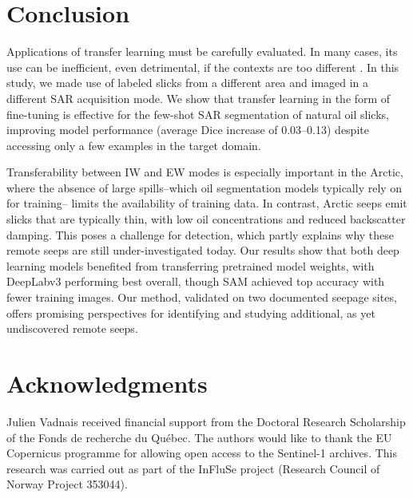 \documentclass[lettersize,journal]{IEEEtran}
\begin{document}
\section{Conclusion}
Applications of transfer learning must be carefully evaluated. In many cases, its use can be inefficient, even detrimental, if the contexts are too different \cite{mensinkFactorsInfluenceTransfer2022}.
In this study, we made use of labeled slicks from a different area and imaged in a different SAR acquisition mode. We show that transfer learning in the form of fine-tuning is effective for the few-shot SAR segmentation
of natural oil slicks, improving model performance (average Dice increase of 0.03--0.13) despite accessing only a few examples in the target domain.

Transferability between IW and EW modes is especially important in the Arctic, where the absence of large spills--which oil segmentation models typically rely on for training-- 
limits the availability of training data. In contrast, Arctic seeps emit slicks that are typically thin, with low oil concentrations and reduced backscatter damping.
This poses a challenge for detection, which partly explains why these remote seeps are still under-investigated today. Our results show that both deep learning models benefited from transferring pretrained model weights, 
with DeepLabv3 performing best overall, though SAM achieved top accuracy with fewer training images. Our method, validated on two documented seepage sites, offers promising perspectives for
identifying and studying additional, as yet undiscovered remote seeps.

\section*{Acknowledgments}
Julien Vadnais received financial support from the Doctoral Research Scholarship of the Fonds de recherche du Québec. 
The authors would like to thank the EU Copernicus programme for allowing open access to the Sentinel-1 archives.
This research was carried out as part of the InFluSe project (Research Council of Norway Project 353044).


\end{document}
